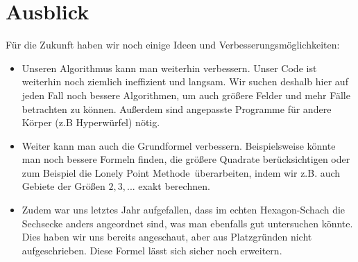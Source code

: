 \documentclass[11pt,a4paper]{article}
\numberwithin{equation}{section}
\numberwithin{table}{section}
\numberwithin{figure}{section}
\begin{document}
\section{Ausblick}
Für die Zukunft haben wir noch einige Ideen und Verbesserungsmöglichkeiten:
\begin{itemize}
\item Unseren Algorithmus kann man weiterhin verbessern. Unser Code ist weiterhin noch ziemlich ineffizient und langsam. Wir suchen deshalb hier auf jeden Fall noch bessere Algorithmen, um auch größere Felder und mehr Fälle betrachten zu können. Außerdem sind angepasste Programme für andere Körper (z.B Hyperwürfel) nötig.
\item Weiter kann man auch die Grundformel verbessern. Beispielsweise könnte man noch bessere Formeln finden, die größere Quadrate berücksichtigen oder zum Beispiel die \glqq Lonely Point Methode\grqq~überarbeiten, indem wir z.B. auch Gebiete der Größen $2,3,...$ exakt berechnen.
\item 
Zudem war uns letztes Jahr aufgefallen, dass im echten Hexagon-Schach die Sechsecke anders angeordnet sind, was man ebenfalls gut untersuchen könnte. Dies haben wir uns bereits angeschaut, aber aus Platzgründen nicht aufgeschrieben. Diese Formel lässt sich sicher noch erweitern. 
\end{itemize}
\end{document}
